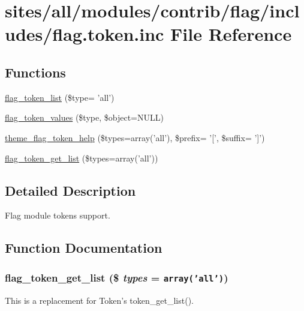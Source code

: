 \hypertarget{flag_8token_8inc}{
\section{sites/all/modules/contrib/flag/includes/flag.token.inc File Reference}
\label{flag_8token_8inc}
}
\subsection*{Functions}
\begin{CompactItemize}
\item 
\hyperlink{flag_8token_8inc_1f02eb9b8c7ce2009805b9c47ec45b20}{flag\_\-token\_\-list} (\$type= 'all')
\item 
\hyperlink{flag_8token_8inc_52a7ba3fca937ebf4d95df90dc531151}{flag\_\-token\_\-values} (\$type, \$object=NULL)
\item 
\hyperlink{flag_8token_8inc_19695478804e51a9c21274a3acbf3387}{theme\_\-flag\_\-token\_\-help} (\$types=array('all'), \$prefix= '\mbox{[}', \$suffix= '\mbox{]}')
\item 
\hyperlink{flag_8token_8inc_bd1686618a4a8ef7eaf9a80e8b3089ba}{flag\_\-token\_\-get\_\-list} (\$types=array('all'))
\end{CompactItemize}


\subsection{Detailed Description}
Flag module tokens support. 

\subsection{Function Documentation}
\hypertarget{flag_8token_8inc_bd1686618a4a8ef7eaf9a80e8b3089ba}{
\subsubsection[{flag\_\-token\_\-get\_\-list}]{\setlength{\rightskip}{0pt plus 5cm}flag\_\-token\_\-get\_\-list (\$ {\em types} = {\tt array('all')})}}
\label{flag_8token_8inc_bd1686618a4a8ef7eaf9a80e8b3089ba}


This is a replacement for Token's token\_\-get\_\-list().

